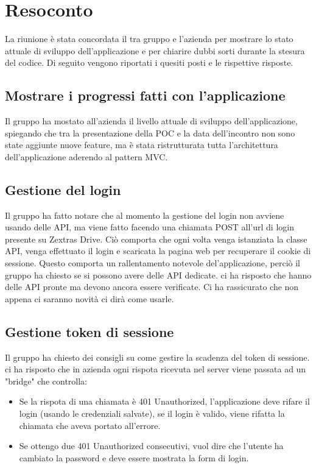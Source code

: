 \section{Resoconto}

La riunione è stata concordata il tra gruppo \textit{\Gruppo{}} e l'azienda per mostrare lo stato attuale di sviluppo dell'applicazione e per chiarire dubbi sorti durante la stesura del codice. Di seguito vengono riportati i quesiti posti e le rispettive risposte. 

\subsection{Mostrare i progressi fatti con l'applicazione}
Il gruppo ha mostato all'azienda il livello attuale di sviluppo dell'applicazione, spiegando che tra la presentazione della POC e la data dell'incontro non sono state aggiunte nuove feature, 
ma è stata ristrutturata tutta l'architettura dell'applicazione aderendo al pattern MVC.

\subsection{Gestione del login}
Il gruppo ha fatto notare che al momento la gestione del login non avviene usando delle API, ma viene fatto facendo una chiamata POST all'url di login presente su Zextras Drive.
Ciò comporta che ogni volta venga istanziata la classe API, venga effettuato il login e scaricata la pagina web per recuperare il cookie di sessione. Questo comporta un rallentamento notevole del'applicazione, 
perciò il gruppo ha chiesto se si possono avere delle API dedicate. \Federico{} ci ha risposto che hanno delle API pronte ma devono ancora essere verificate. Ci ha rassicurato che non appena ci saranno novità ci dirà come usarle.

\subsection{Gestione token di sessione}
Il gruppo ha chiesto dei consigli su come gestire la scadenza del token di sessione. \Alessio{} ci ha risposto che in azienda ogni rispota ricevuta nel server viene passata ad un "bridge" che controlla:
\begin{itemize}
    \item Se la rispota di una chiamata è 401 Unauthorized, l'applicazione deve rifare il login (usando le credenziali salvate), se il login è valido, viene rifatta la chiamata che aveva portato all'errore.
    \item Se ottengo due 401 Unauthorized consecutivi, vuol dire che l'utente ha cambiato la password e deve essere mostrata la form di login.
\end{itemize}

